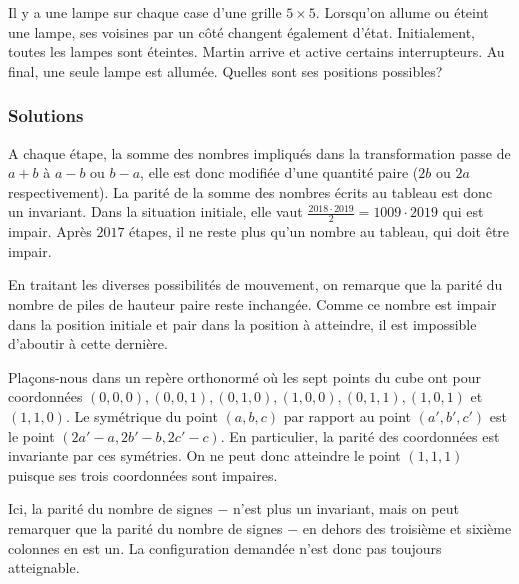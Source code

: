 \begin{exo}
Il y a une lampe sur chaque case d'une grille $5\times5$. Lorsqu'on allume ou éteint une lampe, ses voisines par un côté changent également d'état. Initialement, toutes les lampes sont éteintes. Martin arrive et active certains interrupteurs. Au final, une seule lampe est allumée. Quelles sont ses positions possibles?
\end{exo}

\subsubsection{Solutions}

\begin{sol}
A chaque étape, la somme des nombres impliqués dans la transformation passe de $a+b$ à $a-b$ ou $b-a$, elle est donc modifiée d'une quantité paire ($2b$ ou $2a$ respectivement). La parité de la somme des nombres écrits au tableau est donc un invariant. Dans la situation initiale, elle vaut $\frac{2018\cdot 2019}2=1009\cdot 2019$ qui est impair. Après $2017$ étapes, il ne reste plus qu'un nombre au tableau, qui doit être impair.
\end{sol}

\begin{sol}
En traitant les diverses possibilités de mouvement, on remarque que la parité du nombre de piles de hauteur paire reste inchangée. Comme ce nombre est impair dans la position initiale et pair dans la position à atteindre, il est impossible d'aboutir à cette dernière.
\end{sol}

\begin{sol}
Plaçons-nous dans un repère orthonormé où les sept points du cube ont pour coordonnées $(0,0,0),(0,0,1),(0,1,0),(1,0,0),(0,1,1),(1,0,1)$ et $(1,1,0)$. Le symétrique du point $(a,b,c)$ par rapport au point $(a',b',c')$ est le point $(2a'-a,2b'-b,2c'-c)$. En particulier, la parité des coordonnées est invariante par ces symétries. On ne peut donc atteindre le point $(1,1,1)$ puisque ses trois coordonnées sont impaires.
\end{sol}

\begin{sol}
Ici, la parité du nombre de signes $-$ n'est plus un invariant, mais on peut remarquer que la parité du nombre de signes $-$ en dehors des troisième et sixième colonnes en est un. La configuration demandée n'est donc pas toujours atteignable.
\end{sol}

